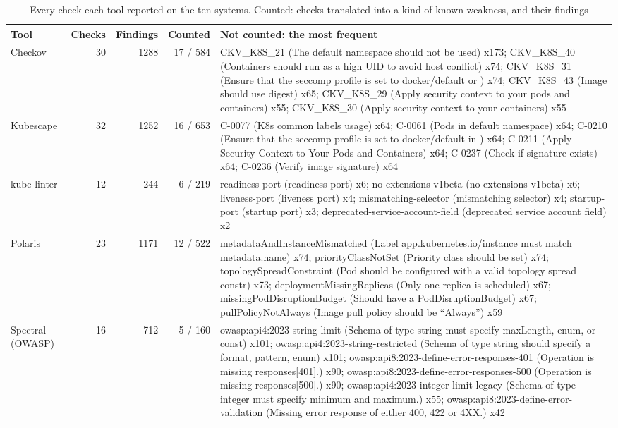 \documentclass[conference]{IEEEtran}
\begin{document}
\begin{table}[!t]
\caption{Every check each tool reported on the ten systems. Counted: checks translated into a kind of known weakness, and their findings}
\label{tab:checks}
\centering
\scriptsize
\setlength{\tabcolsep}{3pt}
\begin{tabular}{@{}lrrr>{\raggedright\arraybackslash}p{12.2cm}@{}}
\toprule
Tool & Checks & Findings & Counted & Not counted: the most frequent \\
\midrule
Checkov & 30 & 1288 & 17 / 584 & CKV\_K8S\_21 (The default namespace should not be used) x173; CKV\_K8S\_40 (Containers should run as a high UID to avoid host conflict) x74; CKV\_K8S\_31 (Ensure that the seccomp profile is set to docker/default or ) x74; CKV\_K8S\_43 (Image should use digest) x65; CKV\_K8S\_29 (Apply security context to your pods and containers) x55; CKV\_K8S\_30 (Apply security context to your containers) x55 \\
Kubescape & 32 & 1252 & 16 / 653 & C-0077 (K8s common labels usage) x64; C-0061 (Pods in default namespace) x64; C-0210 (Ensure that the seccomp profile is set to docker/default in ) x64; C-0211 (Apply Security Context to Your Pods and Containers) x64; C-0237 (Check if signature exists) x64; C-0236 (Verify image signature) x64 \\
kube-linter & 12 & 244 & 6 / 219 & readiness-port (readiness port) x6; no-extensions-v1beta (no extensions v1beta) x6; liveness-port (liveness port) x4; mismatching-selector (mismatching selector) x4; startup-port (startup port) x3; deprecated-service-account-field (deprecated service account field) x2 \\
Polaris & 23 & 1171 & 12 / 522 & metadataAndInstanceMismatched (Label app.kubernetes.io/instance must match metadata.name) x74; priorityClassNotSet (Priority class should be set) x74; topologySpreadConstraint (Pod should be configured with a valid topology spread constr) x73; deploymentMissingReplicas (Only one replica is scheduled) x67; missingPodDisruptionBudget (Should have a PodDisruptionBudget) x67; pullPolicyNotAlways (Image pull policy should be ``Always'') x59 \\
Spectral (OWASP) & 16 & 712 & 5 / 160 & owasp:api4:2023-string-limit (Schema of type string must specify maxLength, enum, or const) x101; owasp:api4:2023-string-restricted (Schema of type string should specify a format, pattern, enum) x101; owasp:api8:2023-define-error-responses-401 (Operation is missing responses[401].) x90; owasp:api8:2023-define-error-responses-500 (Operation is missing responses[500].) x90; owasp:api4:2023-integer-limit-legacy (Schema of type integer must specify minimum and maximum.) x55; owasp:api8:2023-define-error-validation (Missing error response of either 400, 422 or 4XX.) x42 \\

\end{tabular}
\end{table}
\end{document}
